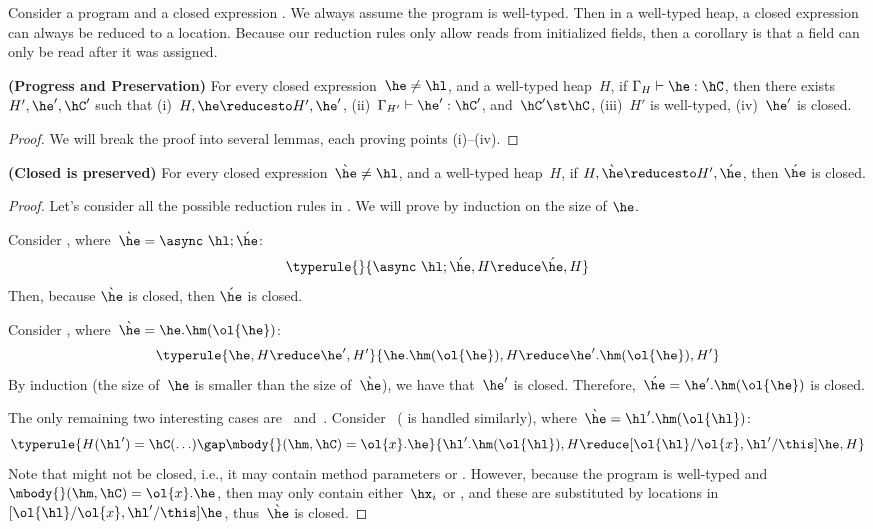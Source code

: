 \documentclass[a4paper]{article}
\begin{document}
Consider a program \hP and a closed expression \he.
We always assume the program is well-typed.
Then in a well-typed heap, a closed expression can always be reduced to a location.
Because our reduction rules only allow reads from initialized fields,
    then a corollary is that a field can only be read after it was assigned.


\begin{Theorem}[preservation]
  \textbf{(Progress and Preservation)}
    For every closed expression~$\he \neq \hl$, and a well-typed heap~$H$,
        if $\Gamma_{H} \vdash \he : \hC$,
        then there exists~$H',\he',\hC'$ such that
        (i)~$H,\he \reducesto H',\he'$,
        (ii)~$\Gamma_{H'} \vdash \he':\hC'$,
        and~$\hC' \st \hC$,
        (iii)~$H'$ is well-typed,
        (iv)~$\he'$ is closed.
\end{Theorem}
\begin{proof}
We will break the proof into several lemmas, each proving points (i)--(iv).
\end{proof}

\begin{Lemma}[closed]
  \textbf{(Closed is preserved)}
    For every closed expression~$\grave{\he} \neq \hl$, and a well-typed heap~$H$,
        if $H,\grave{\he} \reducesto H',\acute{\he}$,
        then $\acute{\he}$ is closed.
\end{Lemma}
\begin{proof}
Let's consider all the possible reduction rules in .
We will prove by induction on the size of $\he$.

Consider , where~$\grave{\he} = \async~\hl;\acute{\he}$:
\[\typerule{
}{
  \async~\hl;\acute{\he},H \reduce \acute{\he},H
}
\]
Then, because $\grave{\he}$ is closed, then $\acute{\he}$ is closed.

Consider , where~$\grave{\he} = \he.\hm(\ol{\he})$:
\[\typerule{
    \he,H \reduce \he',H'
}{
  \he.\hm(\ol{\he}),H \reduce \he'.\hm(\ol{\he}),H'
}
\]
By induction (the size of~$\he$ is smaller than the size of~$\grave{\he}$), we have that~$\he'$ is closed.
Therefore,~$\acute{\he} = \he'.\hm(\ol{\he})$ is closed.

The only remaining two interesting cases are~ and~.
Consider~ ( is handled similarly), where~$\grave{\he} = \hl'.\hm(\ol{\hl})$:
\[
\typerule{
    H(\hl')=\hC(\ldots)
        \gap
    \mbody{}(\hm,\hC)=\ol{x}.\he
}{
  \hl'.\hm(\ol{\hl}),H \reduce [\ol{\hl}/\ol{x},\hl'/\this]\he,H
}
\]
Note that \he might not be closed, i.e., it may contain method parameters or \this.
However, because the program is well-typed and~$\mbody{}(\hm,\hC)=\ol{x}.\he$,
    then \he may only contain either~$\hx_i$ or \this,
    and these are substituted by locations in~$[\ol{\hl}/\ol{x},\hl'/\this]\he$,
    thus~$\grave{\he}$ is closed.
\end{proof}
\end{document}
